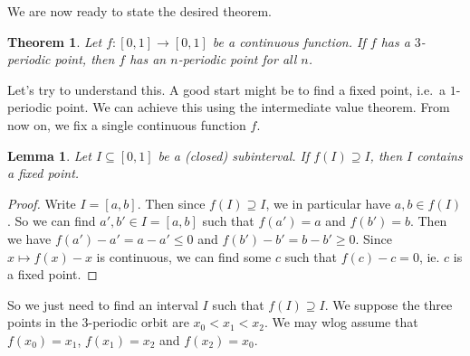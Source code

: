 \documentclass{shortart}
\newtheorem*{thm}{Theorem}
\newtheorem*{lemma}{Lemma}
\theoremstyle{definition}
\begin{document}
\begin{center}
\end{center}

We are now ready to state the desired theorem.

\begin{thm}
  Let $f: [0, 1] \to [0, 1]$ be a continuous function. If $f$ has a $3$-periodic point, then $f$ has an $n$-periodic point for all $n$.
\end{thm}

Let's try to understand this. A good start might be to find a fixed point, i.e.\ a $1$-periodic point. We can achieve this using the intermediate value theorem. From now on, we fix a single continuous function $f$.

\begin{lemma}
  Let $I \subseteq [0, 1]$ be a (closed) subinterval. If $f(I) \supseteq I$, then $I$ contains a fixed point.
\end{lemma}

\begin{proof}
  Write $I = [a, b]$. Then since $f(I) \supseteq I$, we in particular have $a, b \in f(I)$. So we can find $a', b' \in I = [a, b]$ such that $f(a') = a$ and $f(b') = b$. Then we have $f(a') - a' = a - a' \leq 0$ and $f(b') - b' = b - b' \geq 0$. Since $x \mapsto f(x) - x$ is continuous, we can find some $c$ such that $f( c ) - c= 0$, ie. $c$ is a fixed point.
\end{proof}

So we just need to find an interval $I$ such that $f(I) \supseteq I$. We suppose the three points in the $3$-periodic orbit are $x_0 < x_1 < x_2$. We may wlog assume that $f(x_0) = x_1$, $f(x_1) = x_2$ and $f(x_2) = x_0$.
\end{document}

